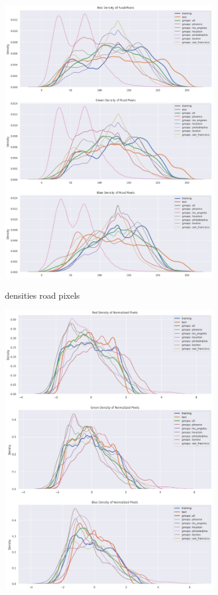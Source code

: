 \documentclass[10pt,conference,compsocconf]{IEEEtran}
\begin{document}
\begin{figure}[ht]
\begin{subfigure}{0.495\textwidth}
        \includegraphics[width=.9\textwidth]{pictures/distr_pixels_road.png}
        \label{fig:distr_pixels_road}
        \caption{densities road pixels}
    \end{subfigure}
    \begin{subfigure}{0.495\textwidth}
        \includegraphics[width=.9\textwidth]{pictures/distr_pixels_norm.png}

\end{subfigure}
\end{figure}
\end{document}
